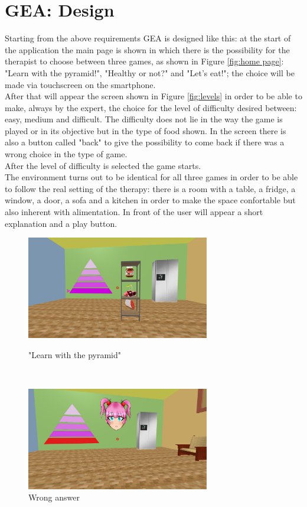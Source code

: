 \documentclass{sigchi-ext}
\begin{document}
\section{GEA: Design}
Starting from the above requirements GEA is designed like this: at the start of the application the main page is shown in which there is the possibility for the therapist to choose between three games, as shown in Figure \ref{fig:home page}: "Learn with the pyramid!", "Healthy or not?" and "Let's eat!"; the choice will be made via touchscreen on the smartphone. \\
After that will appear the screen shown in Figure \ref{fig:levels} in order to be able to make, always by the expert, the choice for the level of difficulty desired between: easy, medium and difficult. The difficulty does not lie in the way the game is played or in its objective but in the type of food shown. In the screen there is also a button called "back" to give the possibility to come back if there was a wrong choice in the type of game.\\
After the level of difficulty is selected the game starts.\\
The environment turns out to be identical for all three games in order to be able to follow the real setting of the therapy: there is a room with a table, a fridge, a window, a door, a sofa and a kitchen in order to make the space confortable but also inherent with alimentation. In front of the user will appear a short explanation and a play button.\\
\medskip
\begin{figure}
 \begin{minipage}[c]{\columnwidth}
   \centering
   \includegraphics[width=8cm]{figures/Pyramid1.png}
   \caption{"Learn with the pyramid"}
   \label{fig:Pyramid}
 \end{minipage}
 \ \hspace{2mm} \hspace{3mm} \
 \begin{minipage}[c]{\columnwidth}
  \centering
   \includegraphics[width=8cm]{figures/Wrong.png}
   \caption{Wrong answer}
   \label{fig:wrong}
 \end{minipage}
\end{figure}
\end{document}
